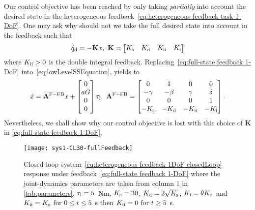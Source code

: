 Our control objective has been reached by only taking \emph{partially} into account the desired state in the heterogeneous feedback~\eqref{eq:heterogeneous feedback task 1-DoF}. One may ask why should not we take the full desired state into account in the feedback such that 
\begin{equation}\label{eq:full-state feedback 1-DoF}
	\ddot{\hat{q}}_{\rm d} = -\mathbf{K}x, \ \mathbf{K} = \begin{bmatrix}
		K_{\rm s} & K_{\rm d} & K_{\rm ii} & K_{\rm i}
	\end{bmatrix}
\end{equation}
where $K_{\rm ii}>0$ is the double integral feedback. Replacing~\eqref{eq:full-state feedback 1-DoF} into~\eqref{eq:lowLevelSSEquation}, yields to 
\begin{equation}\label{eq:fullState feedback 1DoF closedLoop}
	\dot{x} = \mathbf{A}^{\rm F-FB}x + \begin{bmatrix}
		0 \\ aG \\ 0 \\ 0
	\end{bmatrix}\tau_{\rm l}, \ \mathbf{A}^{\rm F-FB} = 
	\begin{bmatrix}
		0 & 1 & 0 & 0 \\
		-\gamma & -\beta & \gamma & \delta \\ 
		0 & 0 & 0 & 1 \\ 
		-K_{\rm s} & -K_{\rm d} & 	-K_{\rm ii} & -K_{\rm i} 
	\end{bmatrix}.
\end{equation}
Nevertheless, we shall show why our control objective is lost with this choice of $\mathbf{K}$ in \cref{eq:full-state feedback 1-DoF}.
\begin{figure}
	\centering
	\texttt{[image: sys1-CL30-fullFeedback]}
	\caption{Closed-loop system~\eqref{eq:heterogeneous feedback 1DoF closedLoop} response under feedback~\eqref{eq:full-state feedback 1-DoF} where the joint-dynamics parameters are taken from column 1 in \cref{tab:parameters}, $\tau_{\rm l} = 5$~Nm, $K_{\rm s} = 30$, $K_{\rm d}= 2\sqrt{K_{\rm s}}$, $K_{\rm i}= \theta K_{\rm d}$ and $K_{\rm ii} = K_{\rm s}$ for $0\leq t\leq5$~s then $K_{\rm ii} = 0$ for $t\geq5$~s. }
	\label{fig:fullstate closedloop 1dof simulation}
\end{figure}


